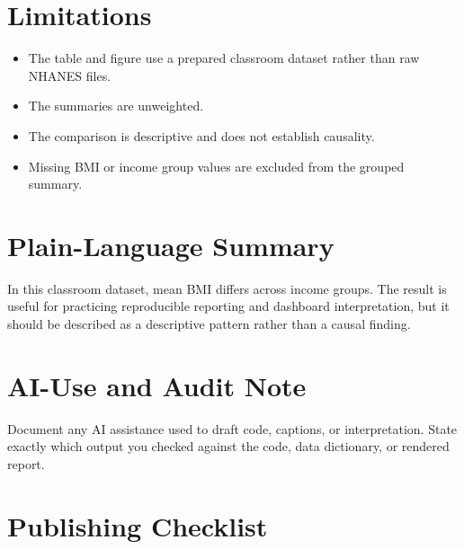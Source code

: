 \documentclass[
  letterpaper,
  DIV=11,
  numbers=noendperiod,
  oneside]{scrreprt}
\providecommand{\tightlist}{%
  \setlength{\itemsep}{0pt}\setlength{\parskip}{0pt}}
\begin{document}
\section*{Limitations}\label{limitations-1}


\begin{itemize}
\tightlist
\item
  The table and figure use a prepared classroom dataset rather than raw
  NHANES files.
\item
  The summaries are unweighted.
\item
  The comparison is descriptive and does not establish causality.
\item
  Missing BMI or income group values are excluded from the grouped
  summary.
\end{itemize}

\section*{Plain-Language Summary}\label{plain-language-summary}


In this classroom dataset, mean BMI differs across income groups. The
result is useful for practicing reproducible reporting and dashboard
interpretation, but it should be described as a descriptive pattern
rather than a causal finding.

\section*{AI-Use and Audit Note}\label{ai-use-and-audit-note}


Document any AI assistance used to draft code, captions, or
interpretation. State exactly which output you checked against the code,
data dictionary, or rendered report.

\section*{Publishing Checklist}\label{publishing-checklist}

\end{document}
